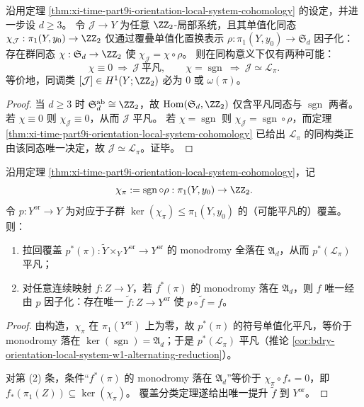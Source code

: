 \begin{corollary}\label{cor:xi-time-part9i-sign-local-system-completeness}
沿用定理 \ref{thm:xi-time-part9i-orientation-local-system-cohomology} 的设定，并进一步设 \(d\ge 3\)。
令 \(\mathcal J\to Y\) 为任意 \(\ZZ_2\)-局部系统，且其单值化同态 \(\chi_{\mathcal J}:\pi_1(Y,y_0)\to\ZZ_2\) 仅通过覆叠单值化置换表示 \(\rho:\pi_1(Y,y_0)\to\mathfrak S_d\) 因子化：
存在群同态 \(\chi:\mathfrak S_d\to\ZZ_2\) 使 \(\chi_{\mathcal J}=\chi\circ\rho\)。
则在同构意义下仅有两种可能：
\[
\chi\equiv 0\ \Longrightarrow\ \mathcal J\ \text{平凡},\qquad
\chi=\operatorname{sgn}\ \Longrightarrow\ \mathcal J\simeq \mathcal L_\pi.
\]
等价地，同调类 \([\mathcal J]\in H^1(Y;\ZZ_2)\) 必为 \(0\) 或 \(\omega(\pi)\)。
\end{corollary}
\begin{proof}
当 \(d\ge 3\) 时 \(\mathfrak S_d^{\mathrm{ab}}\cong \ZZ_2\)，故 \(\mathrm{Hom}(\mathfrak S_d,\ZZ_2)\) 仅含平凡同态与 \(\operatorname{sgn}\) 两者。
若 \(\chi\equiv 0\) 则 \(\chi_{\mathcal J}\equiv 0\)，从而 \(\mathcal J\) 平凡。
若 \(\chi=\operatorname{sgn}\) 则 \(\chi_{\mathcal J}=\operatorname{sgn}\circ\rho\)，而定理 \ref{thm:xi-time-part9i-orientation-local-system-cohomology} 已给出 \(\mathcal L_\pi\) 的同构类正由该同态唯一决定，故 \(\mathcal J\simeq \mathcal L_\pi\)。证毕。
\end{proof}

\begin{theorem}[最小定向化二重基变与普适因子化]\label{thm:xi-time-part9i-minimal-orientation-double-cover}
沿用定理 \ref{thm:xi-time-part9i-orientation-local-system-cohomology}，记
\[
\chi_\pi:=\operatorname{sgn}\circ\rho:\pi_1(Y,y_0)\to\ZZ_2.
\]
令 \(p:Y^{\mathrm{or}}\to Y\) 为对应于子群 \(\ker(\chi_\pi)\le \pi_1(Y,y_0)\) 的（可能平凡的）覆盖。
则：
\begin{enumerate}
  \item 拉回覆盖 \(p^\ast(\pi):\widetilde Y\times_Y Y^{\mathrm{or}}\to Y^{\mathrm{or}}\) 的 monodromy 全落在 \(\mathfrak A_d\)，从而 \(p^\ast(\mathcal L_\pi)\) 平凡；
  \item 对任意连续映射 \(f:Z\to Y\)，若 \(f^\ast(\pi)\) 的 monodromy 落在 \(\mathfrak A_d\)，则 \(f\) 唯一经由 \(p\) 因子化：存在唯一 \(\widetilde f:Z\to Y^{\mathrm{or}}\) 使 \(p\circ\widetilde f=f\)。
\end{enumerate}
\end{theorem}
\begin{proof}
由构造，\(\chi_\pi\) 在 \(\pi_1(Y^{\mathrm{or}})\) 上为零，故 \(p^\ast(\pi)\) 的符号单值化平凡，等价于 monodromy 落在 \(\ker(\operatorname{sgn})=\mathfrak A_d\)；于是 \(p^\ast(\mathcal L_\pi)\) 平凡（推论 \ref{cor:bdry-orientation-local-system-w1-alternating-reduction}）。

对第 (2) 条，条件“\(f^\ast(\pi)\) 的 monodromy 落在 \(\mathfrak A_d\)”等价于
\(
\chi_\pi\circ f_\ast=0
\)，即
\(
f_\ast(\pi_1(Z))\subseteq \ker(\chi_\pi)
\)。
覆盖分类定理遂给出唯一提升 \(\widetilde f\) 到 \(Y^{\mathrm{or}}\)。
\end{proof}

